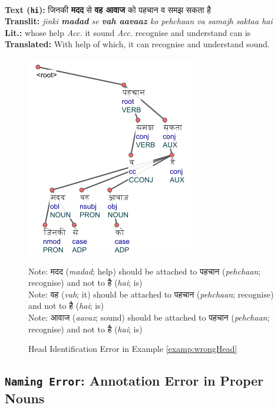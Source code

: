\begin{example}
\label{examp:wrongHead}
\textbf{ }\\
\textbf{Text (\texttt{hi}):} \texthindi{जिनकी \textbf{मदद} से \textbf{वह आवाज} को पहचान व समझ सकता है}\\
\textbf{Translit:} \textit{jinki \textbf{madad} se \textbf{vah aavaaz} ko pehchaan va samajh saktaa hai}\\
\textbf{Lit.:} whose help \textit{Acc.} it sound \textit{Acc.} recognise and understand can is\\
\textbf{Translated:} With help of which, it can recognise and understand sound.
\end{example}

\begin{figure}[H]
    \centering
    \includegraphics[scale=0.90]{img/wrongHead.png}
    \caption{Head Identification Error in Example \ref{examp:wrongHead}}
    Note: \texthindi{मदद} (\textit{madad}; help) should be attached to \texthindi{पहचान} (\textit{pehchaan}; recognise) and not to \texthindi{है} (\textit{hai}; is)\\
    Note: \texthindi{वह} (\textit{vah}; it) should be attached to \texthindi{पहचान} (\textit{pehchaan}; recognise) and not to \texthindi{है} (\textit{hai}; is)\\
    Note: \texthindi{आवाज} (\textit{aavaz}; sound) should be attached to \texthindi{पहचान} (\textit{pehchaan}; recognise) and not to \texthindi{है} (\textit{hai}; is)\\
    \label{examp:wrongHead-fig}
\end{figure}

\subsection[Annotation Error in Proper Nouns: \texttt{Naming Error}]{\texttt{Naming Error}: Annotation Error in Proper Nouns}

